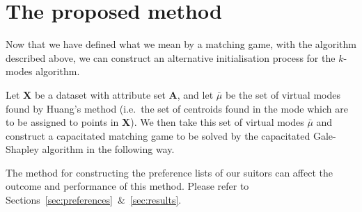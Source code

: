 \section{The proposed method}\label{sec:proposed-method}

Now that we have defined what we mean by a matching game, with the algorithm 
described above, we can construct an alternative initialisation process for the 
\(k\)-modes algorithm.

Let \textbf{X} be a dataset with attribute set \textbf{A}, and let \(\bar{\mu}\) 
be the set of virtual modes found by Huang's method (i.e.\ the set of centroids 
found in the mode which are to be assigned to points in \textbf{X}). We then 
take this set of virtual modes \(\bar{\mu}\) and construct a capacitated 
matching game to be solved by the capacitated Gale-Shapley algorithm in the 
following way.

\begin{singlespace}
    
\end{singlespace}

\begin{remark}
    The method for constructing the preference lists of our suitors can affect
    the outcome and performance of this method. Please refer to
    Sections~\ref{sec:preferences}~\&~\ref{sec:results}.
\end{remark}
